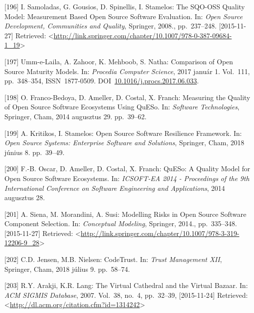 \documentclass[12pt,magyar,a4paper,oneside]{scrreprt}
\begin{document}
\leavevmode\hypertarget{ref-samoladas_sqo-oss_2008}{}%
{[}196{]} I. Samoladas, G. Gousios, D. Spinellis, I. Stamelos: The
SQO-OSS Quality Model: Measurement Based Open Source Software
Evaluation. In: \emph{Open Source Development, Communities and Quality},
Springer, 2008., pp.~237--248. {[}2015-11-27{]} Retrieved:
\textless{}\url{http://link.springer.com/chapter/10.1007/978-0-387-09684-1_19}\textgreater{}

\leavevmode\hypertarget{ref-umm-e-laila_comparison_2017}{}%
{[}197{]} Umm-e-Laila, A. Zahoor, K. Mehboob, S. Natha: Comparison of
Open Source Maturity Models. In: \emph{Procedia Computer Science}, 2017
január 1. Vol.~111, pp.~348--354, ISSN~1877-0509.
DOI~\href{https://doi.org/10.1016/j.procs.2017.06.033}{10.1016/j.procs.2017.06.033}.

\leavevmode\hypertarget{ref-franco-bedoya_measuring_2014}{}%
{[}198{]} O. Franco-Bedoya, D. Ameller, D. Costal, X. Franch: Measuring
the Quality of Open Source Software Ecosystems Using QuESo. In:
\emph{Software Technologies}, Springer, Cham, 2014 augusztus 29.
pp.~39--62.

\leavevmode\hypertarget{ref-kritikos_open_2018}{}%
{[}199{]} A. Kritikos, I. Stamelos: Open Source Software Resilience
Framework. In: \emph{Open Source Systems: Enterprise Software and
Solutions}, Springer, Cham, 2018 június 8. pp.~39--49.

\leavevmode\hypertarget{ref-oscar_queso_2014}{}%
{[}200{]} F.-B. Oscar, D. Ameller, D. Costal, X. Franch: QuESo: A
Quality Model for Open Source Software Ecosystems. In: \emph{ICSOFT-EA
2014 - Proceedings of the 9th International Conference on Software
Engineering and Applications}, 2014 augusztus 28.

\leavevmode\hypertarget{ref-siena_modelling_2014}{}%
{[}201{]} A. Siena, M. Morandini, A. Susi: Modelling Risks in Open
Source Software Component Selection. In: \emph{Conceptual Modeling},
Springer, 2014., pp.~335--348. {[}2015-11-27{]} Retrieved:
\textless{}\url{http://link.springer.com/chapter/10.1007/978-3-319-12206-9_28}\textgreater{}

\leavevmode\hypertarget{ref-jensen_codetrust_2018}{}%
{[}202{]} C.D. Jensen, M.B. Nielsen: CodeTrust. In: \emph{Trust
Management XII}, Springer, Cham, 2018 július 9. pp.~58--74.

\leavevmode\hypertarget{ref-arakji_virtual_2007}{}%
{[}203{]} R.Y. Arakji, K.R. Lang: The Virtual Cathedral and the Virtual
Bazaar. In: \emph{ACM SIGMIS Database}, 2007. Vol.~38, no.~4,
pp.~32--39, {[}2015-11-24{]} Retrieved:
\textless{}\url{http://dl.acm.org/citation.cfm?id=1314242}\textgreater{}
\end{document}
